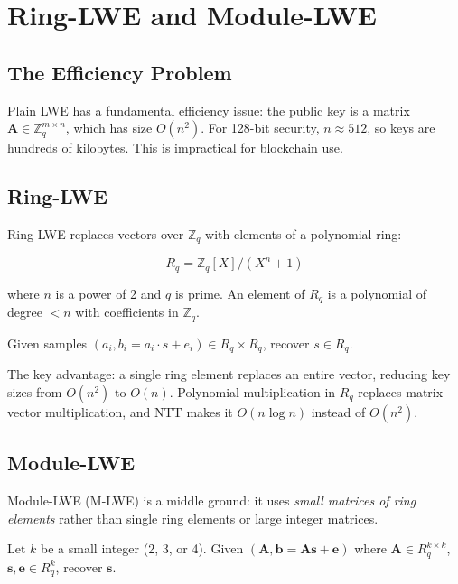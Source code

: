 \section{Ring-LWE and Module-LWE}


\subsection{The Efficiency Problem}

Plain LWE has a fundamental efficiency issue: the public key is a matrix $\mathbf{A} \in
\mathbb{Z}_q^{m \times n}$, which has size $O(n^2)$. For 128-bit security, $n \approx 512$,
so keys are hundreds of kilobytes. This is impractical for blockchain use.

\subsection{Ring-LWE}

Ring-LWE replaces vectors over $\mathbb{Z}_q$ with elements of a polynomial ring:

\[
R_q = \mathbb{Z}_q[X] / (X^n + 1)
\]

where $n$ is a power of 2 and $q$ is prime. An element of $R_q$ is a polynomial of
degree $< n$ with coefficients in $\mathbb{Z}_q$.

\begin{definition}
Given samples $(a_i, b_i = a_i \cdot s + e_i) \in R_q \times R_q$, recover $s \in R_q$.
\end{definition}

The key advantage: a single ring element replaces an entire vector, reducing key sizes
from $O(n^2)$ to $O(n)$. Polynomial multiplication in $R_q$ replaces matrix-vector
multiplication, and NTT makes it $O(n \log n)$ instead of $O(n^2)$.

\subsection{Module-LWE}

Module-LWE (M-LWE) is a middle ground: it uses \emph{small matrices of ring elements}
rather than single ring elements or large integer matrices.

\begin{definition}
Let $k$ be a small integer (2, 3, or 4). Given
$(\mathbf{A}, \mathbf{b} = \mathbf{A}\mathbf{s} + \mathbf{e})$ where
$\mathbf{A} \in R_q^{k \times k}$, $\mathbf{s}, \mathbf{e} \in R_q^k$,
recover $\mathbf{s}$.
\end{definition}

